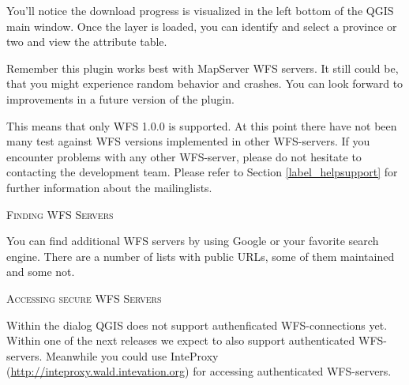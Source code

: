 You'll notice the download progress is visualized in the left bottom of the QGIS main window.
Once the layer is loaded, you can identify and select a province or two and view the
attribute table.

Remember this plugin works best with MapServer WFS servers. It still
could be, that you might experience random behavior
and crashes. You can look forward to improvements in a future version of the plugin.

This means that only WFS 1.0.0 is supported. At this point there have not
been many test against WFS versions implemented in other WFS-servers.
If you encounter problems with any other WFS-server, please do not
hesitate to contacting the development team. Please refer to Section
\ref{label_helpsupport} for further information about the mailinglists.

\begin{Tip}[htb]\caption{\textsc{Finding WFS Servers}}
You can find additional WFS servers by using Google or your
favorite search engine. There are a number of lists with public URLs, some
of them maintained and some not.
\end{Tip}

\begin{Tip}[htb]\caption{\textsc{Accessing secure WFS Servers}}
Within the dialog  QGIS does not support
authenficated WFS-connections yet. Within one of the next releases we expect
to also support authenticated WFS-servers. Meanwhile you could use InteProxy
(\url{http://inteproxy.wald.intevation.org}) for accessing authenticated
WFS-servers.
\end{Tip}

\FloatBarrier
